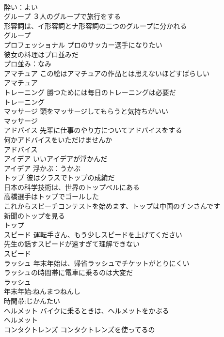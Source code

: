 \documentclass[8pt]{extreport}
\begin{document}
\begin{CJK}{UTF8}{min}
\\	酔い：よい
\\	グループ	３人のグループで旅行をする 
\\	形容詞は、イ形容詞とナ形容詞の二つのグループに分かれる 
\\	グループ			
\\	プロフェッショナル	プロのサッカー選手になりたい 
\\	彼女の料理はプロ並みだ 
\\	プロ並み：なみ
\\	アマチュア	この絵はアマチュアの作品とは思えないほどすばらしい 
\\	アマチュア			
\\	トレーニング	勝つためには毎日のトレーニングは必要だ 
\\	トレーニング			
\\	マッサージ	頭をマッサージしてもらうと気持ちがいい 
\\	マッサージ			
\\	アドバイス	先輩に仕事のやり方についてアドバイスをする 
\\	何かアドバイスをいただけませんか 
\\	アドバイス			
\\	アイデア	いいアイデアが浮かんだ 
\\	アイデア			浮かぶ：うかぶ
\\	トップ	彼はクラスでトップの成績だ 
\\	日本の科学技術は、世界のトップベルにある 
\\	高橋選手はトップでゴールした 
\\	これからスピーチコンテストを始めます、トップは中国のチンさんです 
\\	新聞のトップを見る 
\\	トップ			
\\	スピード	運転手さん、もう少しスピードを上げてください 
\\	先生の話すスピードが速すぎて理解できない 
\\	スピード			
\\	ラッシュ	年末年始は、帰省ラッシュでチケットがとりにくい 
\\	ラッシュの時間帯に電車に乗るのは大変だ 
\\	ラッシュ			
\\	年末年始:ねんまつねんし
\\	時間帯:じかんたい
\\	ヘルメット	バイクに乗るときは、ヘルメットをかぶる 
\\	ヘルメット			
\\	コンタクトレンズ	コンタクトレンズを使ってるの 

\end{CJK}
\end{document}
